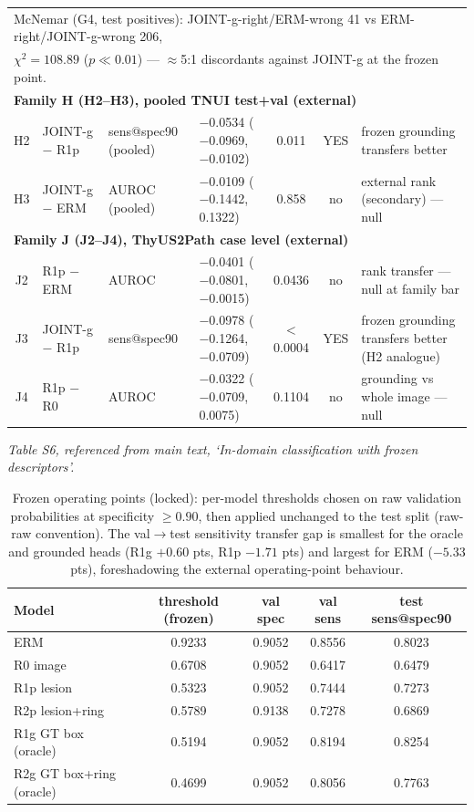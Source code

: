 \documentclass[11pt]{article}
\begin{document}
\begin{table}[!ht]
{\begin{tabular}{clllccl}
\multicolumn{7}{l}{McNemar (G4, test positives): JOINT-g-right/ERM-wrong 41 vs ERM-right/JOINT-g-wrong 206,}\\
\multicolumn{7}{l}{$\chi^2 = 108.89$ ($p \ll 0.01$) --- $\approx$5:1 discordants against JOINT-g at the frozen point.}\\
\multicolumn{7}{l}{\textbf{Family H (H2--H3), pooled TNUI test+val (external)}}\\
H2 & JOINT-g $-$ R1p & sens@spec90 (pooled) & $-$0.0534 ($-$0.0969, $-$0.0102) & 0.011 & YES & frozen grounding transfers better \\
H3 & JOINT-g $-$ ERM & AUROC (pooled) & $-$0.0109 ($-$0.1442, 0.1322) & 0.858 & no & external rank (secondary) --- null \\
\midrule
\multicolumn{7}{l}{\textbf{Family J (J2--J4), ThyUS2Path case level (external)}}\\
J2 & R1p $-$ ERM      & AUROC       & $-$0.0401 ($-$0.0801, $-$0.0015) & 0.0436 & no  & rank transfer --- null at family bar \\
J3 & JOINT-g $-$ R1p  & sens@spec90 & $-$0.0978 ($-$0.1264, $-$0.0709) & $<$0.0004 & YES & frozen grounding transfers better (H2 analogue) \\
J4 & R1p $-$ R0       & AUROC       & $-$0.0322 ($-$0.0709, 0.0075)  & 0.1104 & no  & grounding vs whole image --- null \\
\bottomrule
\end{tabular}%
}
\end{table}

\noindent\emph{Table S6, referenced from main text, `In-domain classification with frozen descriptors'.}

\begin{table}[!ht]
\centering\small
\caption{Frozen operating points (locked): per-model thresholds chosen on raw
validation probabilities at specificity $\geq 0.90$, then applied unchanged to
the test split (raw-raw convention). The val$\to$test sensitivity transfer gap
is smallest for the oracle and grounded heads (R1g $+0.60$ pts, R1p $-1.71$
pts) and largest for ERM ($-5.33$ pts), foreshadowing the external
operating-point behaviour.}
\label{tab:spec90}
\begin{tabular}{lcccc}
\toprule
Model & threshold (frozen) & val spec & val sens & test sens@spec90 \\
\midrule
ERM            & 0.9233 & 0.9052 & 0.8556 & 0.8023 \\
R0 image       & 0.6708 & 0.9052 & 0.6417 & 0.6479 \\
R1p lesion     & 0.5323 & 0.9052 & 0.7444 & 0.7273 \\
R2p lesion+ring & 0.5789 & 0.9138 & 0.7278 & 0.6869 \\
R1g GT box (oracle) & 0.5194 & 0.9052 & 0.8194 & 0.8254 \\
R2g GT box+ring (oracle) & 0.4699 & 0.9052 & 0.8056 & 0.7763 \\
\bottomrule
\end{tabular}
\end{table}
\end{document}
